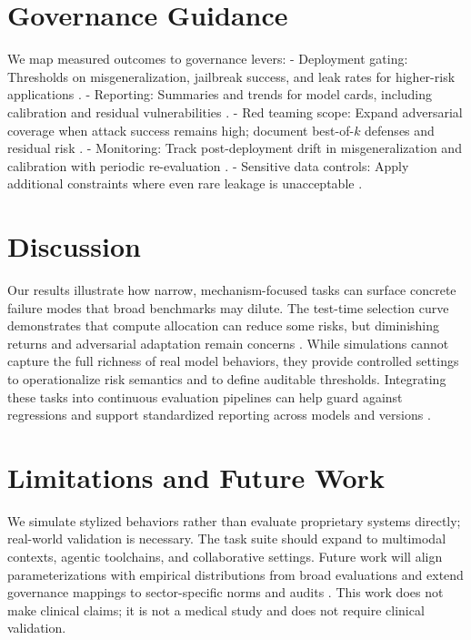 \documentclass[11pt]{article}
\begin{document}
\section{Governance Guidance}
We map measured outcomes to governance levers:
- Deployment gating: Thresholds on misgeneralization, jailbreak success, and leak rates for higher-risk applications \citep{Shevlane2023ExtremeRiskEval,Weidinger2021Risks}.
- Reporting: Summaries and trends for model cards, including calibration and residual vulnerabilities \citep{Mitchell2019ModelCards,Datasheets2021}.
- Red teaming scope: Expand adversarial coverage when attack success remains high; document best-of-$k$ defenses and residual risk \citep{Perez2022RedTeam,Ganguli2022RTLM,Ribeiro2020CheckList}.
- Monitoring: Track post-deployment drift in misgeneralization and calibration with periodic re-evaluation \citep{Uesato2018RigorousEval}.
- Sensitive data controls: Apply additional constraints where even rare leakage is unacceptable \citep{Carlini2021Extraction}.

\section{Discussion}
Our results illustrate how narrow, mechanism-focused tasks can surface concrete failure modes that broad benchmarks may dilute. The test-time selection curve demonstrates that compute allocation can reduce some risks, but diminishing returns and adversarial adaptation remain concerns \citep{Zou2023UniversalJailbreak}. While simulations cannot capture the full richness of real model behaviors, they provide controlled settings to operationalize risk semantics and to define auditable thresholds. Integrating these tasks into continuous evaluation pipelines can help guard against regressions and support standardized reporting across models and versions \citep{Liang2022HELM,Mitchell2019ModelCards,Perez2022ModelWrittenEvals,Bommasani2021}.

\section{Limitations and Future Work}
We simulate stylized behaviors rather than evaluate proprietary systems directly; real-world validation is necessary. The task suite should expand to multimodal contexts, agentic toolchains, and collaborative settings. Future work will align parameterizations with empirical distributions from broad evaluations \citep{Liang2022HELM,Srivastava2023BIGBench} and extend governance mappings to sector-specific norms and audits \citep{Shevlane2023ExtremeRiskEval}. This work does not make clinical claims; it is not a medical study and does not require clinical validation.
\end{document}
